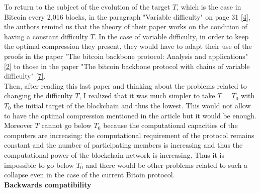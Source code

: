 \documentclass[12pt,a4paper]{article}
\newcommand{\source}[1]{\hyperlink{#1}{[#1]}}
\begin{document}
	To return to the subject of the evolution of the target $T$, which is the case in Bitcoin every 2,016 blocks, in the paragraph "Variable difficulty" on page 31 \source{4}, the authors remind us that the theory of their paper works on the condition of having a constant difficulty $T$. In the case of variable difficulty, in order to keep the optimal compression they present, they would have to adapt their use of the proofs in the paper "The bitcoin backbone protocol: Analysis and applications" \source{2} to those in the paper "The bitcoin backbone protocol with chains of variable difficulty" \source{7}.\\
	Then, after reading this last paper and thinking about the problems related to changing the difficulty $T$, I realized that it was much simpler to take $T$ = $T_0$ with $T_0$ the initial target of the blockchain and thus the lowest. This would not allow to have the optimal compression mentioned in the article but it would be enough. Moreover $T$ cannot go below $T_0$ because the computational capacities of the computers are increasing: the computational requirement of the protocol remains constant and the number of participating members is increasing and thus the computational power of the blockchain network is increasing. Thus it is impossible to go below $T_0$ and there would be other problems related to such a collapse even in the case of the current Bitoin protocol.\\
	
	\textbf{Backwards compatibility\\}
	
\end{document}
